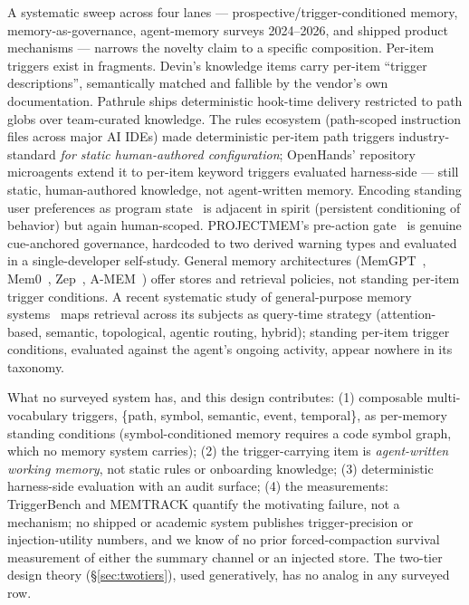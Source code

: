 \documentclass[11pt]{article}
\begin{document}
A systematic sweep across four lanes --- prospective/trigger-conditioned
memory, memory-as-governance, agent-memory surveys 2024--2026, and
shipped product mechanisms --- narrows the novelty claim to a specific
composition. Per-item triggers exist in fragments. Devin's knowledge
items carry per-item ``trigger descriptions'', semantically matched
and fallible by the vendor's own documentation. Pathrule ships
deterministic hook-time delivery restricted to path globs over
team-curated knowledge. The rules ecosystem (path-scoped instruction
files across major AI IDEs) made deterministic per-item path triggers
industry-standard \emph{for static human-authored configuration};
OpenHands' repository microagents extend it to per-item keyword
triggers evaluated harness-side --- still static, human-authored
knowledge, not agent-written memory. Encoding standing user
preferences as program state~\cite{userascode} is adjacent in spirit (persistent
conditioning of behavior) but again human-scoped. PROJECTMEM's
pre-action gate~\cite{projectmem} is genuine cue-anchored governance,
hardcoded to two derived warning types and evaluated in a
single-developer self-study. General memory architectures (MemGPT~\cite{memgpt},
Mem0~\cite{memzero}, Zep~\cite{zep}, A-MEM~\cite{amem}) offer stores and retrieval
policies, not standing per-item trigger conditions. A recent
systematic study of general-purpose memory systems~\cite{agentnative} maps retrieval
across its subjects as query-time strategy (attention-based, semantic,
topological, agentic routing, hybrid); standing per-item trigger
conditions, evaluated against the agent's ongoing activity, appear
nowhere in its taxonomy.

What no surveyed system has, and this design contributes: (1)
composable multi-vocabulary triggers, \{path, symbol, semantic, event,
temporal\}, as per-memory standing conditions (symbol-conditioned
memory requires a code symbol graph, which no memory system carries);
(2) the trigger-carrying item is \emph{agent-written working memory}, not
static rules or onboarding knowledge; (3) deterministic harness-side
evaluation with an audit surface; (4) the measurements: TriggerBench
and MEMTRACK quantify the motivating failure, not a mechanism; no
shipped or academic system publishes trigger-precision or
injection-utility numbers, and we know of no prior forced-compaction
survival measurement of either the summary channel or an injected
store. The two-tier design theory (\S\ref{sec:twotiers}), used generatively, has no
analog in any surveyed row.
\end{document}
